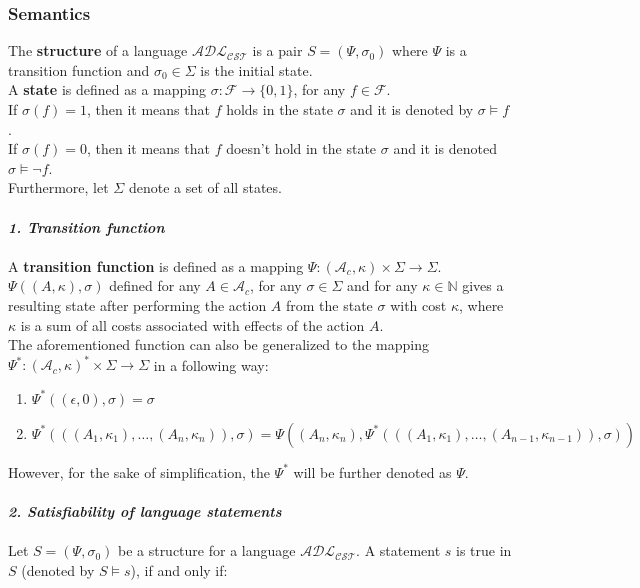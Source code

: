 \documentclass[a4paper]{article}
\begin{document}
\subsubsection{Semantics}
%
The \textbf{structure} of a language $\mathcal{ADL_{CST}}$ is a pair $S=(\Psi,\sigma_0)$ where $\Psi$ is a transition function and $\sigma_0\in\Sigma$ is the initial state. \\[0.5\baselineskip]
A \textbf{state} is defined as a mapping $\sigma\colon\mathcal{F}\rightarrow\{0, 1\}$, for any $f\in\mathcal{F}$. \\
If $\sigma(f)=1$, then it means that $f$ holds in the state $\sigma$ and it is denoted by $\sigma\models f$. \\
If $\sigma(f)=0$, then it means that $f$ doesn't hold in the state $\sigma$ and it is denoted $\sigma\models\neg f$. \\
Furthermore, let $\Sigma$ denote a set of all states. 
\\ \\
\textbf{\textit{1. Transition function}}
\\ \\
A \textbf{transition function} is defined as a mapping $\Psi\colon(\mathcal{A}_c,\kappa)\times\Sigma\rightarrow\Sigma$. \\
$\Psi((A,\kappa),\sigma)$ defined for any $A\in\mathcal{A}_c$, for any $\sigma\in\Sigma$ and for any $\kappa\in\mathbb{N}$ gives a resulting state after performing the action $A$ from the state $\sigma$ with cost $\kappa$, where $\kappa$ is a sum of all costs associated with effects of the action $A$. \\[0.5\baselineskip]
The aforementioned function can also be generalized to the mapping $\Psi^\ast\colon(\mathcal{A}_c,\kappa)^\ast\times\Sigma\rightarrow\Sigma$ in a following way:
\begin{enumerate}
    \item $\Psi^\ast((\epsilon,0),\sigma)=\sigma$
    \item $\Psi^\ast(((A_1,\kappa_1),\dotsc,(A_n,\kappa_n)),\sigma)=\Psi((A_n,\kappa_n),\Psi^\ast(((A_1,\kappa_1),\dotsc,(A_{n-1},\kappa_{n-1})),\sigma))$
\end{enumerate}
However, for the sake of simplification, the $\Psi^\ast$ will be further denoted as $\Psi$.
\\ \\
\textbf{\textit{2. Satisfiability of language statements}}
\\ \\
Let $S=(\Psi, \sigma_0)$ be a structure for a language $\mathcal{ADL_{CST}}$. A statement $s$ is true in $S$ (denoted by $S\models s$), if and only if:
\end{document}
